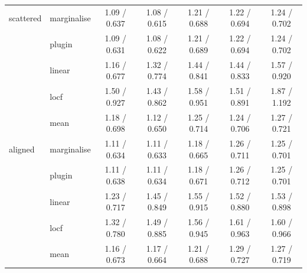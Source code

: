 \begin{table}[htbp]
\begin{tabular}{llccccc}
    \addlinespace
    scattered & marginalise & 1.09 / 0.637 & 1.08 / 0.615 & 1.21 / 0.688 & 1.22 / 0.694 & 1.24 / 0.702 \\
     & plugin & 1.09 / 0.631 & 1.08 / 0.622 & 1.21 / 0.689 & 1.22 / 0.694 & 1.24 / 0.702 \\
     & linear & 1.16 / 0.677 & 1.32 / 0.774 & 1.44 / 0.841 & 1.44 / 0.833 & 1.57 / 0.920 \\
     & locf & 1.50 / 0.927 & 1.43 / 0.862 & 1.58 / 0.951 & 1.51 / 0.891 & 1.87 / 1.192 \\
     & mean & 1.18 / 0.698 & 1.12 / 0.650 & 1.25 / 0.714 & 1.24 / 0.706 & 1.27 / 0.721 \\
    \addlinespace
    aligned & marginalise & 1.11 / 0.634 & 1.11 / 0.633 & 1.18 / 0.665 & 1.26 / 0.711 & 1.25 / 0.701 \\
     & plugin & 1.11 / 0.638 & 1.11 / 0.634 & 1.18 / 0.671 & 1.26 / 0.712 & 1.25 / 0.701 \\
     & linear & 1.23 / 0.717 & 1.45 / 0.849 & 1.55 / 0.915 & 1.52 / 0.880 & 1.53 / 0.898 \\
     & locf & 1.32 / 0.780 & 1.49 / 0.885 & 1.56 / 0.945 & 1.61 / 0.963 & 1.60 / 0.966 \\
     & mean & 1.16 / 0.673 & 1.17 / 0.664 & 1.21 / 0.688 & 1.29 / 0.727 & 1.27 / 0.719 \\
    \bottomrule
  \end{tabular}
\end{table}

